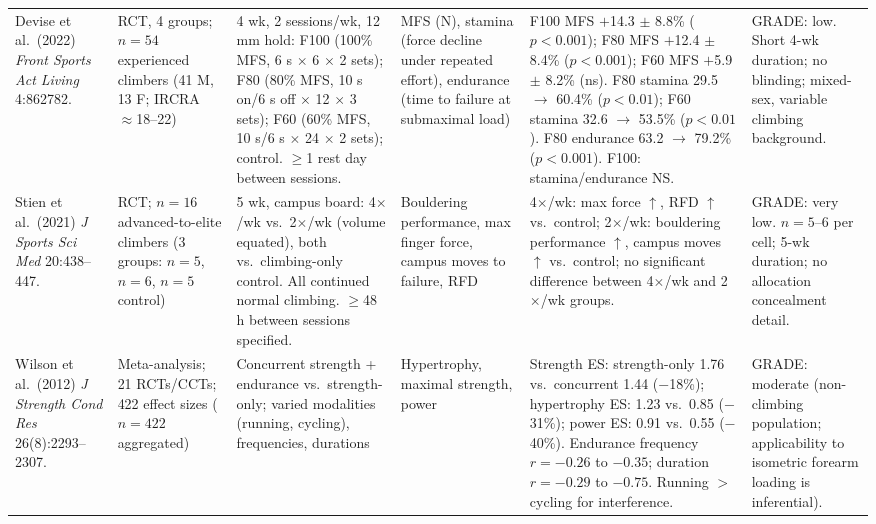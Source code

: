\begin{longtable}{>{\raggedright}p{3.4cm} >{\raggedright}p{2.6cm} >{\raggedright}p{3.8cm} >{\raggedright}p{3.1cm} >{\raggedright}p{3.0cm} >{\raggedright\arraybackslash}p{2.2cm}}
Devise et al.\ (2022) \textit{Front Sports Act Living} 4:862782. \cite{DO22}
& RCT, 4 groups; $n = 54$ experienced climbers (41 M, 13 F; IRCRA $\approx$18–22)
& 4 wk, 2 sessions/wk, 12 mm hold: F100 (100\% MFS, 6 s $\times$ 6 $\times$ 2 sets); F80 (80\% MFS, 10 s on/6 s off $\times$ 12 $\times$ 3 sets); F60 (60\% MFS, 10 s/6 s $\times$ 24 $\times$ 2 sets); control. $\geq$1 rest day between sessions.
& MFS (N), stamina (force decline under repeated effort), endurance (time to failure at submaximal load)
& F100 MFS $+$14.3 $\pm$ 8.8\% ($p < 0.001$); F80 MFS $+$12.4 $\pm$ 8.4\% ($p < 0.001$); F60 MFS $+$5.9 $\pm$ 8.2\% (ns). F80 stamina 29.5 $\to$ 60.4\% ($p < 0.01$); F60 stamina 32.6 $\to$ 53.5\% ($p < 0.01$). F80 endurance 63.2 $\to$ 79.2\% ($p < 0.001$). F100: stamina/endurance NS.
& GRADE: low. Short 4-wk duration; no blinding; mixed-sex, variable climbing background. \\

Stien et al.\ (2021) \textit{J Sports Sci Med} 20:438–447. \cite{SPVE21}
& RCT; $n = 16$ advanced-to-elite climbers (3 groups: $n = 5$, $n = 6$, $n = 5$ control)
& 5 wk, campus board: 4$\times$/wk vs.\ 2$\times$/wk (volume equated), both vs.\ climbing-only control. All continued normal climbing. $\geq$48 h between sessions specified.
& Bouldering performance, max finger force, campus moves to failure, RFD
& 4$\times$/wk: max force $\uparrow$, RFD $\uparrow$ vs.\ control; 2$\times$/wk: bouldering performance $\uparrow$, campus moves $\uparrow$ vs.\ control; no significant difference between 4$\times$/wk and 2$\times$/wk groups.
& GRADE: very low. $n = 5$–6 per cell; 5-wk duration; no allocation concealment detail. \\

Wilson et al.\ (2012) \textit{J Strength Cond Res} 26(8):2293–2307. \cite{WMRE12}
& Meta-analysis; 21 RCTs/CCTs; 422 effect sizes ($n = 422$ aggregated)
& Concurrent strength + endurance vs.\ strength-only; varied modalities (running, cycling), frequencies, durations
& Hypertrophy, maximal strength, power
& Strength ES: strength-only 1.76 vs.\ concurrent 1.44 ($-$18\%); hypertrophy ES: 1.23 vs.\ 0.85 ($-$31\%); power ES: 0.91 vs.\ 0.55 ($-$40\%). Endurance frequency $r = -0.26$ to $-0.35$; duration $r = -0.29$ to $-0.75$. Running $>$ cycling for interference.
& GRADE: moderate (non-climbing population; applicability to isometric forearm loading is inferential). \\

\end{longtable}

